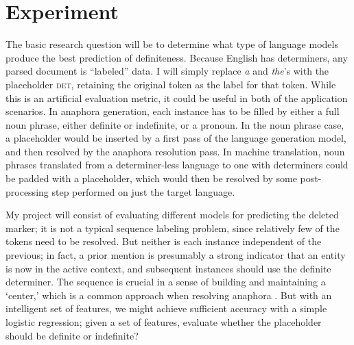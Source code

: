 \documentclass[11pt]{article}
\begin{document}


















\section{Experiment}
The basic research question will be to determine what type of language models produce the best prediction of definiteness. Because English has determiners, any parsed document is ``labeled'' data. I will simply replace \emph{a} and \emph{the}'s with the placeholder \guillemotleft\textsc{det}\guillemotright, retaining the original token as the label for that token. While this is an artificial evaluation metric, it could be useful in both of the application scenarios. In anaphora generation, each instance has to be filled by either a full noun phrase, either definite or indefinite, or a pronoun. In the noun phrase case, a placeholder would be inserted by a first pass of the language generation model, and then resolved by the anaphora resolution pass. In machine translation, noun phrases translated from a determiner-less language to one with determiners could be padded with a placeholder, which would then be resolved by some post-processing step performed on just the target language.

My project will consist of evaluating different models for predicting the deleted marker; it is not a typical sequence labeling problem, since relatively few of the tokens need to be resolved. But neither is each instance independent of the previous; in fact, a prior mention is presumably a strong indicator that an entity is now in the active context, and subsequent instances should use the definite determiner. The sequence is crucial in a sense of building and maintaining a `center,' which is a common approach when resolving anaphora \citep{grosz:1995, beaver:2000}.
But with an intelligent set of features, we might achieve sufficient accuracy with a simple logistic regression; given a set of features, evaluate whether the placeholder should be definite or indefinite?
\end{document}
